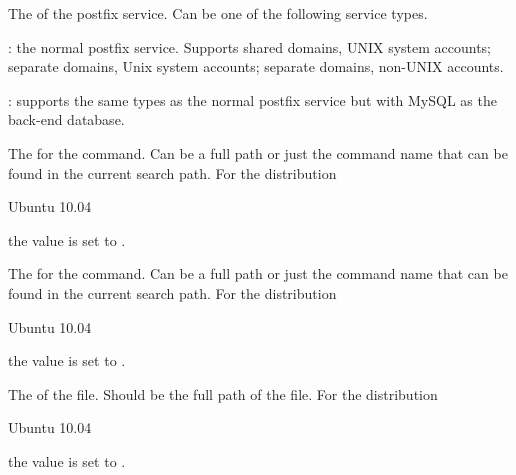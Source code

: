 The  of the postfix service. Can be one of the following 
service types.
\begin{asparaitem}
\item[\qcode{postfix}:] 
the normal postfix service. Supports shared domains, UNIX system accounts;
separate domains, Unix system accounts; separate domains, non-UNIX accounts.

\item[\qcode{postfix-mysql}:] supports the same types as the normal 
postfix service but with MySQL as the back-end database.
\end{asparaitem}


The  for the  command. Can be a full path or
just the command name that can be found in the current search path.
For the distribution
\begin{inparaitem}
\item[\TheDistribution{ubuntu}] Ubuntu 10.04
\end{inparaitem}
the value is set to .


The  for the  command. Can be a full path or
just the command name that can be found in the current search path.
For the distribution
\begin{inparaitem}
\item[\TheDistribution{ubuntu}] Ubuntu 10.04
\end{inparaitem}
the value is set to .


The  of the  file. Should be the full path 
of the file.
For the distribution
\begin{inparaitem}
\item[\TheDistribution{ubuntu}] Ubuntu 10.04
\end{inparaitem}
the value is set to .

